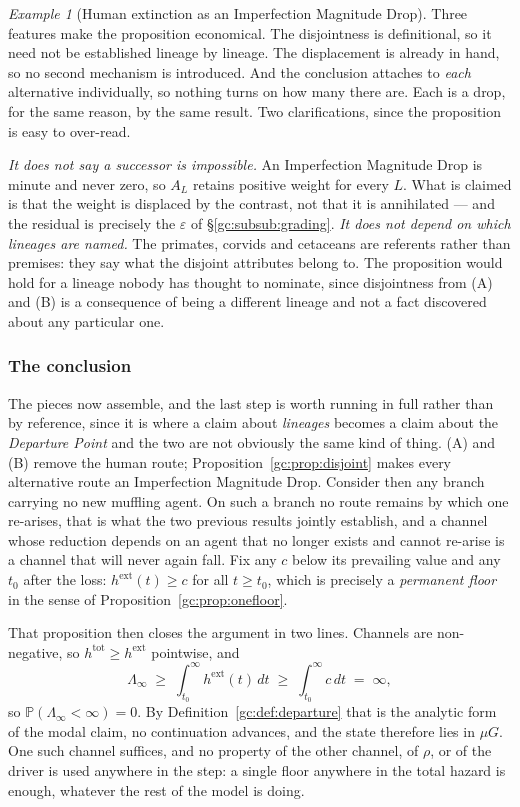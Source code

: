 \documentclass[11pt]{article}
\numberwithin{equation}{section}
\theoremstyle{plain}
\theoremstyle{definition}
\theoremstyle{remark}
\newtheorem{example}[theorem]{Example}
\newcommand{\PP}{\mathbb{P}}
\begin{document}
\begin{example}[Human extinction as an Imperfection Magnitude Drop]
Three features make the proposition economical. The disjointness is
definitional, so it need not be established lineage by lineage. The
displacement is already in hand, so no second mechanism is introduced.
And the conclusion attaches to \emph{each} alternative individually, so
nothing turns on how many there are. Each is a drop, for the same
reason, by the same result. Two clarifications, since the proposition is easy to over-read.

\emph{It does not say a successor is impossible.} An Imperfection
Magnitude Drop is minute and never zero, so $A_L$ retains positive
weight for every $L$. What is claimed is that the weight is displaced
by the contrast, not that it is annihilated --- and the residual is
precisely the $\varepsilon$ of \S\ref{gc:subsub:grading}. \emph{It does not depend on which lineages are named.} The primates,
corvids and cetaceans are referents rather than premises: they say what
the disjoint attributes belong to. The proposition would hold for a
lineage nobody has thought to nominate, since disjointness from (A) and
(B) is a consequence of being a different lineage and not a fact
discovered about any particular one.

\subsubsection{The conclusion}\label{gc:subsub:imdconclusion}

The pieces now assemble, and the last step is worth running in full
rather than by reference, since it is where a claim about \emph{lineages}
becomes a claim about the \emph{Departure Point} and the two are not
obviously the same kind of thing. (A) and (B) remove the human route;
Proposition~\ref{gc:prop:disjoint} makes every alternative route an
Imperfection Magnitude Drop. Consider then any branch carrying no new
muffling agent. On such a branch no route remains by which one
re-arises, that is what the two previous results jointly establish, and a channel whose reduction depends on an agent that no longer
exists and cannot re-arise is a channel that will never again fall.
Fix any $c$ below its prevailing value and any $t_0$ after the loss:
$h^{\mathrm{ext}}(t)\ge c$ for all $t\ge t_0$, which is precisely a
\emph{permanent floor} in the sense of
Proposition~\ref{gc:prop:onefloor}.

That proposition then closes the argument in two lines. Channels are
non-negative, so $h^{\mathrm{tot}}\ge h^{\mathrm{ext}}$ pointwise, and
\[
\Lambda_\infty\;\ge\;\int_{t_0}^{\infty}h^{\mathrm{ext}}(t)\,dt
\;\ge\;\int_{t_0}^{\infty}c\,dt\;=\;\infty ,
\]
so $\PP(\Lambda_\infty<\infty)=0$. By
Definition~\ref{gc:def:departure} that is the analytic form of the
modal claim, no continuation advances, and the state therefore
lies in $\mu G$. One such channel suffices, and no property of the
other channel, of $\rho$, or of the driver is used anywhere in the
step: a single floor anywhere in the total hazard is enough, whatever
the rest of the model is doing.


\end{example}
\end{document}
